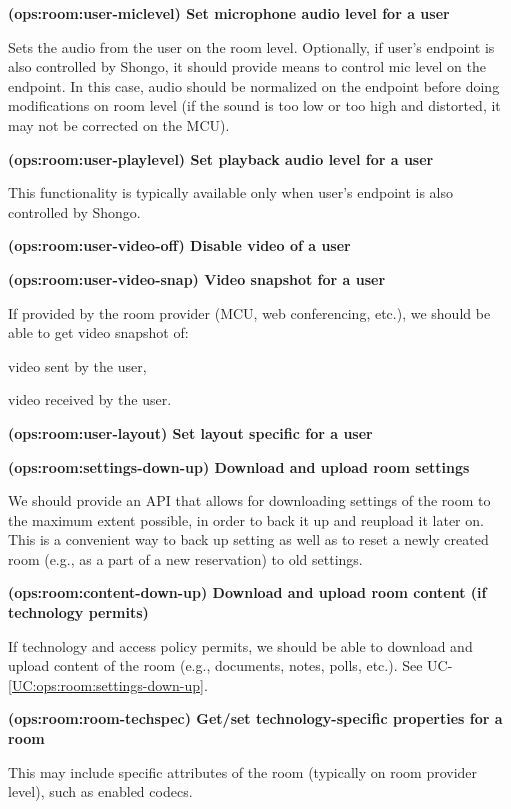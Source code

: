 \documentclass[a4paper]{report}
\makeatletter
\newcounter{UCcounter}
\newenvironment{UseCases}%
	{\begin{list}{\textbf{UC-\arabic{UCcounter}}}{\@nmbrlisttrue\def\@listctr{UCcounter}}}%
	{\end{list}}
\newcommand{\UClabel}[1]{\label{UC:#1}}
\newcommand{\UCref}[1]{UC-\ref{UC:#1}}
\newcommand{\UseCase}[2]{\item\UClabel{#2} \textbf{(#2) #1}\\ \nopagebreak}
\makeatother
\begin{document}
\begin{UseCases}
\UseCase{Set microphone audio level for a user}{ops:room:user-miclevel}

Sets the audio from the user on the room level. Optionally, if user's endpoint
is also controlled by Shongo, it should provide means to control mic level on
the endpoint. In this case, audio should be normalized on the endpoint before
doing modifications on room level (if the sound is too low or too high and
distorted, it may not be corrected on the MCU).

\UseCase{Set playback audio level for a user}{ops:room:user-playlevel}

This functionality is typically available only when user's endpoint is also
controlled by Shongo.

\UseCase{Disable video of a user}{ops:room:user-video-off}

\UseCase{Video snapshot for a user}{ops:room:user-video-snap}

If provided by the room provider (MCU, web conferencing, etc.), we should be
able to get video snapshot of:

\begin{compactitem}

\item video sent by the user,

\item video received by the user.

\end{compactitem}


\UseCase{Set layout specific for a user}{ops:room:user-layout}

\UseCase{Download and upload room settings}{ops:room:settings-down-up}

We should provide an API that allows for downloading settings of the room to
the maximum extent possible, in order to back it up and reupload it later on.
This is a convenient way to back up setting as well as to reset a newly created
room (e.g., as a part of a new reservation) to old settings.

\UseCase{Download and upload room content (if technology
permits)}{ops:room:content-down-up}

If technology and access policy permits, we should be able to download and
upload content of the room (e.g., documents, notes, polls, etc.). See
\UCref{ops:room:settings-down-up}.

\UseCase{Get/set technology-specific properties for a
room}{ops:room:room-techspec}

This may include specific attributes of the room (typically on room provider
level), such as enabled codecs.


\end{UseCases}
\end{document}
